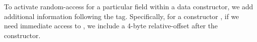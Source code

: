 To activate random-access for a particular field within a data constructor, we
add additional information following the tag.  Specifically, for a constructor
, if we need immediate access to , we include a 4-byte
relative-offset after the constructor.
%


%

